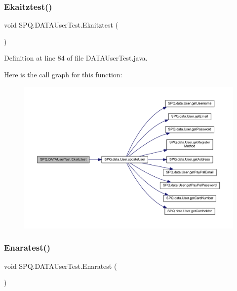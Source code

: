 \subsubsection{\texorpdfstring{Ekaitztest()}{Ekaitztest()}}
{\footnotesize\ttfamily void S\+P\+Q.\+D\+A\+T\+A\+User\+Test.\+Ekaitztest (\begin{DoxyParamCaption}{ }\end{DoxyParamCaption})}



Definition at line 84 of file D\+A\+T\+A\+User\+Test.\+java.

Here is the call graph for this function\+:\nopagebreak
\begin{figure}[H]
\begin{center}
\leavevmode
\includegraphics[width=350pt]{class_s_p_q_1_1_d_a_t_a_user_test_a04242b7156b6bb7828bd569de8027fad_cgraph}
\end{center}
\end{figure}
\mbox{\label{class_s_p_q_1_1_d_a_t_a_user_test_a84d1c3d3992383e1cb93d07241cf3f02}} 
\subsubsection{\texorpdfstring{Enaratest()}{Enaratest()}}
{\footnotesize\ttfamily void S\+P\+Q.\+D\+A\+T\+A\+User\+Test.\+Enaratest (\begin{DoxyParamCaption}{ }\end{DoxyParamCaption})}




